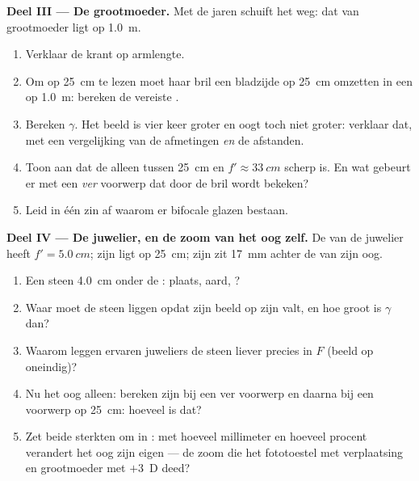 \begin{problem}
\medskip
\noindent\textbf{Deel III --- De grootmoeder.}
Met de jaren schuift het  weg: dat van grootmoeder ligt op
\qty{1.0}{m}.
\begin{enumerate}[resume]
  \item Verklaar de krant op armlengte.
  \item Om op \qty{25}{cm} te lezen moet haar bril een bladzijde op
        \qty{25}{cm} omzetten in een  op \qty{1.0}{m}:
        bereken de vereiste .
  \item Bereken $\gamma$. Het beeld is vier keer groter en oogt toch niet
        groter: verklaar dat, met een vergelijking van de afmetingen
        \emph{en} de afstanden.
  \item Toon aan dat de  alleen tussen \qty{25}{cm} en
        $f' \approx \qty{33}{cm}$ scherp is. En wat gebeurt er met een
        \emph{ver} voorwerp dat door de bril wordt bekeken?
  \item Leid in één zin af waarom er bifocale glazen bestaan.
\end{enumerate}

\medskip
\noindent\textbf{Deel IV --- De juwelier, en de zoom van het oog zelf.}
De  van de juwelier heeft $f' = \qty{5.0}{cm}$; zijn  ligt
op \qty{25}{cm}; zijn  zit \qty{17}{mm} achter de  van zijn
oog.
\begin{enumerate}[resume]
  \item Een steen \qty{4.0}{cm} onder de : plaats, aard, ?
  \item Waar moet de steen liggen opdat zijn beeld op zijn 
        valt, en hoe groot is $\gamma$ dan?
  \item Waarom leggen ervaren juweliers de steen liever precies in $F$
        (beeld op oneindig)?
  \item Nu het oog alleen: bereken zijn  bij een ver voorwerp
        en daarna bij een voorwerp op \qty{25}{cm}: hoeveel 
         is dat?
  \item Zet beide sterkten om in : met hoeveel
        millimeter en hoeveel procent verandert het oog zijn eigen
         --- de zoom die het fototoestel met
        verplaatsing en grootmoeder met $+3$~D deed?
\end{enumerate}
\end{problem}
